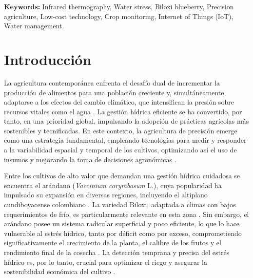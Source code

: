 \documentclass[12pt,openright,oneside]{book}
\begin{document}
\vspace{1cm}

\textbf{Keywords:} Infrared thermography, Water stress, Biloxi blueberry, Precision agriculture, Low-cost technology, Crop monitoring, Internet of Things (IoT), Water management.


\newpage  %

\tableofcontents
\newpage

\renewcommand{\listtablename}{Lista de Tablas}
\listoftables
{}
\newpage


\renewcommand{\listfigurename}{Lista de Figuras}
\listoffigures
{}
\newpage

\chapter*{Introducción}
La agricultura contemporánea enfrenta el desafío dual de incrementar la producción de alimentos para una población creciente y, simultáneamente, adaptarse a los efectos del cambio climático, que intensifican la presión sobre recursos vitales como el agua . La gestión hídrica eficiente se ha convertido, por tanto, en una prioridad global, impulsando la adopción de prácticas agrícolas más sostenibles y tecnificadas. En este contexto, la agricultura de precisión emerge como una estrategia fundamental, empleando tecnologías para medir y responder a la variabilidad espacial y temporal de los cultivos, optimizando así el uso de insumos y mejorando la toma de decisiones agronómicas .

Entre los cultivos de alto valor que demandan una gestión hídrica cuidadosa se encuentra el arándano (\textit{Vaccinium corymbosum} L.), cuya popularidad ha impulsado su expansión en diversas regiones, incluyendo el altiplano cundiboyacense colombiano . La variedad Biloxi, adaptada a climas con bajos requerimientos de frío, es particularmente relevante en esta zona . Sin embargo, el arándano posee un sistema radicular superficial y poco eficiente, lo que lo hace vulnerable al estrés hídrico, tanto por déficit como por exceso, comprometiendo significativamente el crecimiento de la planta, el calibre de los frutos y el rendimiento final de la cosecha . La detección temprana y precisa del estrés hídrico es, por lo tanto, crucial para optimizar el riego y asegurar la sostenibilidad económica del cultivo .
\end{document}

